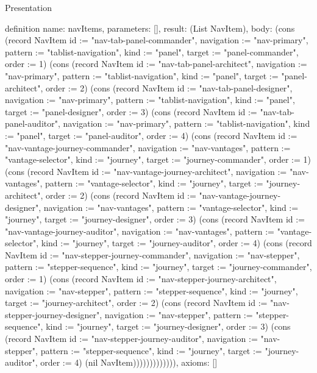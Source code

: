 \begin{lexlean}{Presentation}
\begin{semanticmodule}
definition{
  name: navItems,
  parameters: [],
  result: (List NavItem),
  body: (cons (record NavItem {id := "nav-tab-panel-commander", navigation := "nav-primary", pattern := "tablist-navigation", kind := "panel", target := "panel-commander", order := 1}) (cons (record NavItem {id := "nav-tab-panel-architect", navigation := "nav-primary", pattern := "tablist-navigation", kind := "panel", target := "panel-architect", order := 2}) (cons (record NavItem {id := "nav-tab-panel-designer", navigation := "nav-primary", pattern := "tablist-navigation", kind := "panel", target := "panel-designer", order := 3}) (cons (record NavItem {id := "nav-tab-panel-auditor", navigation := "nav-primary", pattern := "tablist-navigation", kind := "panel", target := "panel-auditor", order := 4}) (cons (record NavItem {id := "nav-vantage-journey-commander", navigation := "nav-vantages", pattern := "vantage-selector", kind := "journey", target := "journey-commander", order := 1}) (cons (record NavItem {id := "nav-vantage-journey-architect", navigation := "nav-vantages", pattern := "vantage-selector", kind := "journey", target := "journey-architect", order := 2}) (cons (record NavItem {id := "nav-vantage-journey-designer", navigation := "nav-vantages", pattern := "vantage-selector", kind := "journey", target := "journey-designer", order := 3}) (cons (record NavItem {id := "nav-vantage-journey-auditor", navigation := "nav-vantages", pattern := "vantage-selector", kind := "journey", target := "journey-auditor", order := 4}) (cons (record NavItem {id := "nav-stepper-journey-commander", navigation := "nav-stepper", pattern := "stepper-sequence", kind := "journey", target := "journey-commander", order := 1}) (cons (record NavItem {id := "nav-stepper-journey-architect", navigation := "nav-stepper", pattern := "stepper-sequence", kind := "journey", target := "journey-architect", order := 2}) (cons (record NavItem {id := "nav-stepper-journey-designer", navigation := "nav-stepper", pattern := "stepper-sequence", kind := "journey", target := "journey-designer", order := 3}) (cons (record NavItem {id := "nav-stepper-journey-auditor", navigation := "nav-stepper", pattern := "stepper-sequence", kind := "journey", target := "journey-auditor", order := 4}) (nil NavItem))))))))))))),
  axioms: []
}


\end{semanticmodule}
\end{lexlean}

